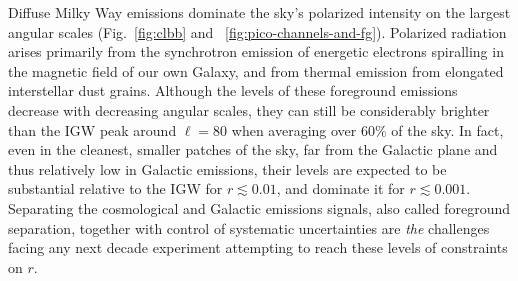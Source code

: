 \documentclass[PICOReport.tex]{subfiles}
\begin{document}

Diffuse Milky Way emissions dominate the sky's polarized intensity on the largest angular scales (Fig.~\ref{fig:clbb} and ~\ref{fig:pico-channels-and-fg}). Polarized radiation arises primarily from the synchrotron emission of energetic electrons spiralling in the magnetic field of our own Galaxy, and from thermal
emission from elongated interstellar dust grains. Although the levels of these foreground emissions decrease with decreasing angular scales, they can still be considerably brighter 
than the \ac{IGW} peak around $\ell=80$ when averaging over 60\% of the sky. 
In fact, even in the cleanest, smaller patches of the sky, far from the Galactic plane and thus relatively low in Galactic emissions, their levels are expected to be substantial relative to the \ac{IGW} for $r \lesssim 0.01$, and dominate it for $r \lesssim0.001$. Separating the cosmological and Galactic emissions signals, also called foreground separation, together with control of systematic uncertainties are {\it the} challenges facing any next decade experiment attempting to reach these levels of constraints on $r$.
\end{document}
